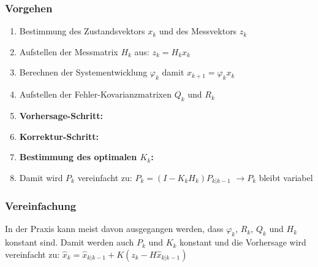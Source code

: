 	\subsubsection{Vorgehen}
	\begin{enumerate}
		\item Bestimmung des Zustandsvektors $x_k$ und des Messvektors $z_k$
		\item Aufstellen der Messmatrix $H_k$ aus: $z_k = H_k x_k$
		\item Berechnen der Systementwicklung $\varphi_k$ damit $x_{k+1}=\varphi_k x_k$
		\item Aufstellen der Fehler-Kovarianzmatrixen $Q_k$ und $R_k$
		\item \textbf{Vorhersage-Schritt:} \hspace{1cm}
		\item \textbf{Korrektur-Schritt:} \hspace{1cm}
		\item \textbf{Bestimmung des optimalen $K_k$:} \hspace{1cm}
		\item Damit wird $P_k$ vereinfacht zu: $P_k = (I-K_kH_k) P_{k|k-1}$ \hspace{1cm} 
		$ \rightarrow P_k$ bleibt variabel
	\end{enumerate}
	
	\subsubsection{Vereinfachung}
		In der Praxis kann meist davon ausgegangen werden, dass $\varphi_k$, $R_k$,
		$Q_k$ und $H_k$ konstant sind. Damit werden auch $P_k$ und $K_k$ konstant und
		die Vorhersage wird vereinfacht zu: $\hat{x}_k = \hat{x}_{k|k-1} 
		+ K(z_k-H\hat{x}_{k|k-1})$ \\